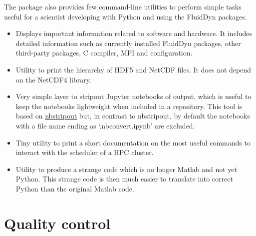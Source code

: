 The package \fluiddyn also provides few command-line utilities to perform
simple tasks useful for a scientist developing with Python and using the
FluidDyn packages.
\begin{itemize}

\item {}

Displays important information related to software and hardware. It
includes detailed information such as currently installed FluidDyn packages,
other third-party packages, C compiler, MPI and \Numpy configuration.

\item {}

Utility to print the hierarchy of HDF5 and NetCDF files. It does not depend on
the NetCDF4 library.

\item {}

Very simple layer to stripout Jupyter notebooks of output, which is useful to
keep the notebooks lightweight when included in a repository.
%
This tool is based on \href{https://github.com/kynan/nbstripout}{nbstripout}
but, in contrast to nbstripout,
%
by default the notebooks with a file name ending as `.nbconvert.ipynb' are
excluded.

\item {}

Tiny utility to print a short documentation on the most useful commands to
interact with the scheduler of a HPC cluster.

\item {}

Utility to produce a strange code which is no longer Matlab and not yet Python.
%
This strange code is then much easier to translate into correct Python than the
original Matlab code.

\end{itemize}


\section{Quality control}


